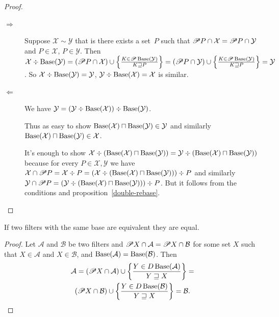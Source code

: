 \begin{proof}
~
\begin{description}
\item[$\Rightarrow$] Suppose $\mathcal{X}\sim\mathcal{Y}$
that is there exists a set~$P$ such that
$\mathscr{P} P\cap\mathcal{X}=\mathscr{P} P\cap\mathcal{Y}$ and
$P\in\mathcal{X}$, $P\in\mathcal{Y}$. Then
$\mathcal{X}\div\operatorname{Base}(\mathcal{Y}) =
(\mathscr{P} P\cap\mathcal{X})\cup
\left\{ \frac{K\in\mathscr{P}\operatorname{Base}(\mathcal{Y})}{K\sqsupseteq P}\right\} =
(\mathscr{P} P\cap\mathcal{Y})\cup
\left\{ \frac{K\in\mathscr{P}\operatorname{Base}(\mathcal{Y})}{K\sqsupseteq P}\right\} =
\mathcal{Y}$. So
$\mathcal{X}\div\operatorname{Base}(\mathcal{Y}) = \mathcal{Y}$,
$\mathcal{Y}\div\operatorname{Base}(\mathcal{X}) = \mathcal{X}$ is similar.

\item[$\Leftarrow$] We have
$\mathcal{Y}=(\mathcal{Y}\div\operatorname{Base}(\mathcal{X}))\div\operatorname{Base}(\mathcal{Y})$.

Thus as easy to show
$\operatorname{Base}(\mathcal{X})\sqcap\operatorname{Base}(\mathcal{Y})\in\mathcal{Y}$
and similarly
$\operatorname{Base}(\mathcal{X})\sqcap\operatorname{Base}(\mathcal{Y})\in\mathcal{X}$.

It's enough to show
$\mathcal{X}\div(\operatorname{Base}(\mathcal{X})\sqcap\operatorname{Base}(\mathcal{Y})) =
\mathcal{Y}\div(\operatorname{Base}(\mathcal{X})\sqcap\operatorname{Base}(\mathcal{Y}))$
because for every $P\in\mathcal{X},\mathcal{Y}$ we have $\mathcal{X}\cap\mathscr{P} P = \mathcal{X}\div P =
(\mathcal{X}\div(\operatorname{Base}(\mathcal{X})\sqcap\operatorname{Base}(\mathcal{Y})))\div P$ and similarly $\mathcal{Y}\cap\mathscr{P} P =
(\mathcal{Y}\div(\operatorname{Base}(\mathcal{X})\sqcap\operatorname{Base}(\mathcal{Y})))\div P$. But it follows from the conditions and
proposition~\ref{double-rebase}.
\end{description}
\end{proof}

\begin{prop}
If two filters with the same base are equivalent they are equal.\end{prop}
\begin{proof}
Let $\mathcal{A}$ and $\mathcal{B}$ be two filters and $\mathscr{P} X\cap\mathcal{A}=\mathscr{P} X\cap\mathcal{B}$
for some set $X$ such that $X\in\mathcal{A}$ and $X\in\mathcal{B}$,
and $\operatorname{Base}(\mathcal{A})=\operatorname{Base}(\mathcal{B})$. Then
\begin{multline*}
\mathcal{A}=(\mathscr{P} X\cap\mathcal{A})\cup\left\{ \frac{Y\in D\operatorname{Base}(\mathcal{A})}{Y\sqsupseteq X}\right\}=\\
(\mathscr{P} X\cap\mathcal{B})\cup
\left\{ \frac{Y\in D\operatorname{Base}(\mathcal{B})}{Y\sqsupseteq X}\right\}=\mathcal{B}.
\end{multline*}
\end{proof}

